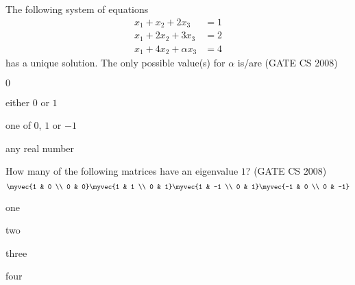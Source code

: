 \item The following system of equations
\begin{align*}
x_1 + x_2 + 2x_3 &= 1 \\
x_1 + 2x_2 + 3x_3 &= 2 \\
x_1 + 4x_2 + \alpha x_3 &= 4
\end{align*} 
has a unique solution. The only possible value(s) for \(\alpha\) is/are
\hfill (GATE CS 2008)
\begin{enumerate}  
\begin{multicols}{2}
    \item $0$ 
    \item either $0$ or $1$ 
    \item one of $0$, $1$ or $-1$
    \item any real number
\end{multicols}
\end{enumerate}
\item How many of the following matrices have an eigenvalue $1$?
\hfill (GATE CS 2008)
$$
\myvec{1 & 0 \\
0 & 0}
\myvec{1 & 1 \\
0 & 1}
\myvec{1 & -1 \\
0 & 1}
\myvec{-1 & 0 \\
0 & -1}
$$
\begin{enumerate}
\begin{multicols}{4}
   \item one
   \item two
   \item three
   \item four
\end{multicols}
\end{enumerate}
